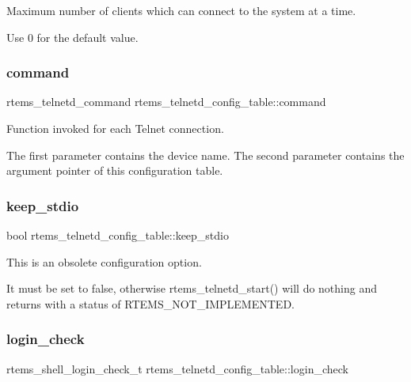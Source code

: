 Maximum number of clients which can connect to the system at a time. 

Use 0 for the default value. \mbox{\label{structrtems__telnetd__config__table_a6da89239f61c6c14a3adeb1adc37f65a}} 
\subsubsection{\texorpdfstring{command}{command}}
{\footnotesize\ttfamily rtems\+\_\+telnetd\+\_\+command rtems\+\_\+telnetd\+\_\+config\+\_\+table\+::command}



Function invoked for each Telnet connection. 

The first parameter contains the device name. The second parameter contains the argument pointer of this configuration table. \mbox{\label{structrtems__telnetd__config__table_afe75dfc13600695a97535c67c5cc7173}} 
\subsubsection{\texorpdfstring{keep\_stdio}{keep\_stdio}}
{\footnotesize\ttfamily bool rtems\+\_\+telnetd\+\_\+config\+\_\+table\+::keep\+\_\+stdio}



This is an obsolete configuration option. 

It must be set to false, otherwise rtems\+\_\+telnetd\+\_\+start() will do nothing and returns with a status of R\+T\+E\+M\+S\+\_\+\+N\+O\+T\+\_\+\+I\+M\+P\+L\+E\+M\+E\+N\+T\+ED. \mbox{\label{structrtems__telnetd__config__table_a5b51d31ac9955bc812d59501f725c3ad}} 
\subsubsection{\texorpdfstring{login\_check}{login\_check}}
{\footnotesize\ttfamily rtems\+\_\+shell\+\_\+login\+\_\+check\+\_\+t rtems\+\_\+telnetd\+\_\+config\+\_\+table\+::login\+\_\+check}



